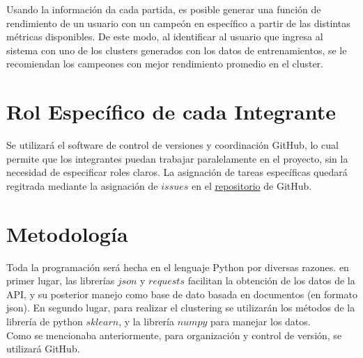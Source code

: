 \documentclass[letterpaper,11pt, spanish]{article}
\begin{document}
Usando la información da cada partida, es posible generar una función de rendimiento
de un usuario con un campeón en específico a partir de las distintas métricas
disponibles. De este modo, al identificar al usuario que ingresa al sistema
con uno de los clusters generados con los datos de entrenamientos, se le recomiendan
los campeones con mejor rendimiento promedio en el cluster. \\

\newpage
\section{Rol Específico de cada Integrante}

Se utilizará el software de control de versiones y coordinación GitHub, lo cual
permite que los integrantes puedan trabajar paralelamente en el proyecto, sin
la necesidad de especificar roles claros. La asignación de tareas específicas
quedará regitrada mediante la asignación de $issues$ en el
\href{https://github.com/fcoclavero/machinelol}{repositorio} de GitHub. \\

\section{Metodología}

Toda la programación será hecha en el lenguaje Python por diversas razones. en
primer lugar, las librerías $json$ y $requests$ facilitan la obtención de los
datos de la API, y su posterior manejo como base de dato basada en documentos
(en formato json). En segundo lugar, para realizar el clustering se utilizarán
los métodos de la librería de python $sklearn$, y la librería $numpy$ para
manejar los datos. \\

Como se mencionaba anteriormente, para organización y control de versión, se
utilizará GitHub.

\end{document}
